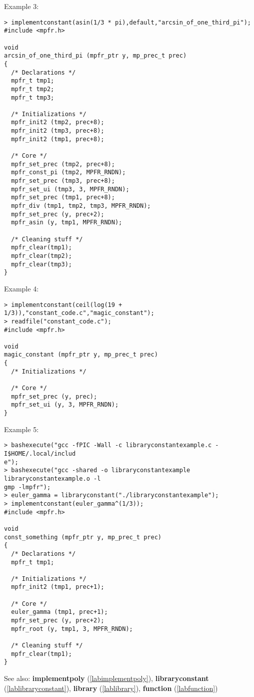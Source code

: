 \noindent Example 3: 
\begin{center}\begin{minipage}{15cm}\begin{Verbatim}[frame=single]
> implementconstant(asin(1/3 * pi),default,"arcsin_of_one_third_pi");
#include <mpfr.h>

void
arcsin_of_one_third_pi (mpfr_ptr y, mp_prec_t prec)
{
  /* Declarations */
  mpfr_t tmp1;
  mpfr_t tmp2;
  mpfr_t tmp3;

  /* Initializations */
  mpfr_init2 (tmp2, prec+8);
  mpfr_init2 (tmp3, prec+8);
  mpfr_init2 (tmp1, prec+8);

  /* Core */
  mpfr_set_prec (tmp2, prec+8);
  mpfr_const_pi (tmp2, MPFR_RNDN);
  mpfr_set_prec (tmp3, prec+8);
  mpfr_set_ui (tmp3, 3, MPFR_RNDN);
  mpfr_set_prec (tmp1, prec+8);
  mpfr_div (tmp1, tmp2, tmp3, MPFR_RNDN);
  mpfr_set_prec (y, prec+2);
  mpfr_asin (y, tmp1, MPFR_RNDN);

  /* Cleaning stuff */
  mpfr_clear(tmp1);
  mpfr_clear(tmp2);
  mpfr_clear(tmp3);
}
\end{Verbatim}
\end{minipage}\end{center}
\noindent Example 4: 
\begin{center}\begin{minipage}{15cm}\begin{Verbatim}[frame=single]
> implementconstant(ceil(log(19 + 1/3)),"constant_code.c","magic_constant");
> readfile("constant_code.c");
#include <mpfr.h>

void
magic_constant (mpfr_ptr y, mp_prec_t prec)
{
  /* Initializations */

  /* Core */
  mpfr_set_prec (y, prec);
  mpfr_set_ui (y, 3, MPFR_RNDN);
}

\end{Verbatim}
\end{minipage}\end{center}
\noindent Example 5: 
\begin{center}\begin{minipage}{15cm}\begin{Verbatim}[frame=single]
> bashexecute("gcc -fPIC -Wall -c libraryconstantexample.c -I$HOME/.local/includ
e");
> bashexecute("gcc -shared -o libraryconstantexample libraryconstantexample.o -l
gmp -lmpfr");
> euler_gamma = libraryconstant("./libraryconstantexample");
> implementconstant(euler_gamma^(1/3));
#include <mpfr.h>

void
const_something (mpfr_ptr y, mp_prec_t prec)
{
  /* Declarations */
  mpfr_t tmp1;

  /* Initializations */
  mpfr_init2 (tmp1, prec+1);

  /* Core */
  euler_gamma (tmp1, prec+1);
  mpfr_set_prec (y, prec+2);
  mpfr_root (y, tmp1, 3, MPFR_RNDN);

  /* Cleaning stuff */
  mpfr_clear(tmp1);
}
\end{Verbatim}
\end{minipage}\end{center}
See also: \textbf{implementpoly} (\ref{labimplementpoly}), \textbf{libraryconstant} (\ref{lablibraryconstant}), \textbf{library} (\ref{lablibrary}), \textbf{function} (\ref{labfunction})
